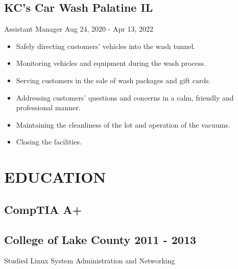 \documentclass[11pt]{article}
\begin{document}
\subsection{KC’s Car Wash Palatine IL}
\label{sec:org8aa2305}
Assistant Manager Aug 24, 2020 - Apr 13, 2022
\begin{itemize}
\item Safely directing customers' vehicles into the wash tunnel.
\item Monitoring vehicles and equipment during the wash process.
\item Serving customers in the sale of wash packages and gift cards.
\item Addressing customers' questions and concerns in a calm, friendly and professional manner.
\item Maintaining the cleanliness of the lot and operation of the vacuums.
\item Closing the facilities.
\end{itemize}


\section{EDUCATION}
\label{sec:orgb500ae3}
\subsection{CompTIA A+}
\label{sec:orga4070d3}

\subsection{College of Lake County 2011 - 2013}
\label{sec:org76d0de6}
Studied Linux System Administration and Networking
\end{document}
